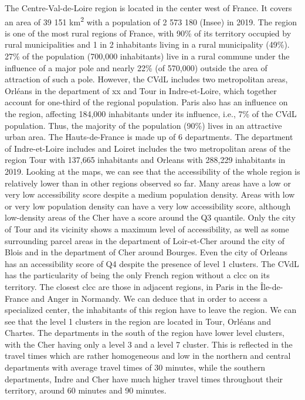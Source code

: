 The Centre-Val-de-Loire region is located in the center west of France. It
covers an area of 39 151 km\textsuperscript{2} with a population of 2 573 180
(Insee) in 2019. The region is one of the most rural regions of France, with
90\% of its territory occupied by rural municipalities and 1 in 2 inhabitants
living in a rural municipality (49\%). 27\% of the population (700,000
inhabitants) live in a rural commune under the influence of a major pole and
nearly 22\% (of 570,000) outside the area of attraction of such a pole. However,
the CVdL includes two metropolitan areas, Orléans in the department of xx and
Tour in Indre-et-Loire, which together account for one-third of the regional
population. Paris also has an influence on the region, affecting 184,000
inhabitants under its influence, i.e., 7\% of the CVdL population. Thus, the
majority of the population (90\%) lives in an attractive urban area. The
Hauts-de-France is made up of 6 departments. The department of Indre-et-Loire
includes and Loiret includes the two metropolitan areas of the region Tour with
137,665 inhabitants and Orleans with 288,229 inhabitants in 2019. Looking at the
maps, we can see that the accessibility of the whole region is relatively lower
than in other regions observed so far. Many areas have a low or very low
accessibility score despite a medium population density. Areas with
low or very low population density can have a very low accessibility score,
although low-density areas of the Cher have a score around the Q3 quantile. Only
the city of Tour and its vicinity shows a maximum level of accessibility, as
well as some surrounding parcel areas in the department of Loir-et-Cher around
the city of Blois and in the department of Cher around Bourges. Even the city of
Orleans has an accessibility score of Q4 despite the presence of level 1
clusters. The CVdL has the particularity of being the only French
region without a \ac{clcc} on its territory. The closest \ac{clcc} are those in
adjacent regions, in Paris in the Île-de-France and Anger in Normandy. We can
deduce that in order to access a specialized center, the inhabitants of this
region have to leave the region.  We can see that the level 1 clusters in the
region are located in Tour, Orléans and Chartes. The departments in the south of
the region have lower level clusters, with the Cher having only a level 3 and a
level 7 cluster. This is reflected in the travel times which are rather
homogeneous and low in the northern and central departments with average travel
times of 30 minutes, while the southern departments, Indre and Cher have much
higher travel times throughout their territory, around 60 minutes and 90
minutes.

